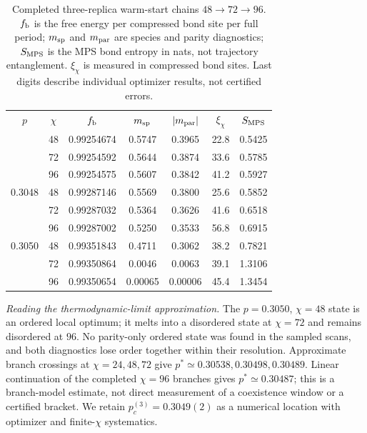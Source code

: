 \begin{table}[t]
\caption{Completed three-replica warm-start chains $48\to72\to96$. $f_{\rm b}$ is the free energy per compressed bond site per full period; $m_{\rm sp}$ and $m_{\rm par}$ are species and parity diagnostics; $S_{\rm MPS}$ is the MPS bond entropy in nats, not trajectory entanglement. $\xi_\chi$ is measured in compressed bond sites. Last digits describe individual optimizer results, not certified errors.}
\label{tab:n3vumps}
\begin{ruledtabular}
\begin{tabular}{ccccccc}
$p$ & $\chi$ & $f_{\rm b}$ & $m_{\rm sp}$ & $|m_{\rm par}|$ & $\xi_\chi$ & $S_{\rm MPS}$\\
\colrule
0.3047 & 48 & 0.99254674 & 0.5747 & 0.3965 & 22.8 & 0.5425\\
       & 72 & 0.99254592 & 0.5644 & 0.3874 & 33.6 & 0.5785\\
       & 96 & 0.99254575 & 0.5607 & 0.3842 & 41.2 & 0.5927\\
0.3048 & 48 & 0.99287146 & 0.5569 & 0.3800 & 25.6 & 0.5852\\
       & 72 & 0.99287032 & 0.5364 & 0.3626 & 41.6 & 0.6518\\
       & 96 & 0.99287002 & 0.5250 & 0.3533 & 56.8 & 0.6915\\
0.3050 & 48 & 0.99351843 & 0.4711 & 0.3062 & 38.2 & 0.7821\\
       & 72 & 0.99350864 & 0.0046 & 0.0063 & 39.1 & 1.3106\\
       & 96 & 0.99350654 & 0.00065 & 0.00006 & 45.4 & 1.3454\\
\end{tabular}
\end{ruledtabular}
\end{table}

\emph{Reading the thermodynamic-limit approximation.} The $p=0.3050$, $\chi=48$ state is an ordered local optimum; it melts into a disordered state at $\chi=72$ and remains disordered at $96$. No parity-only ordered state was found in the sampled scans, and both diagnostics lose order together within their resolution. Approximate branch crossings at $\chi=24,48,72$ give $p^*\simeq0.30538,0.30498,0.30489$. Linear continuation of the completed $\chi=96$ branches gives $p^*\simeq0.30487$; this is a branch-model estimate, not direct measurement of a coexistence window or a certified bracket. We retain $p_c^{(3)}=0.3049(2)$ as a numerical location with optimizer and finite-$\chi$ systematics.

